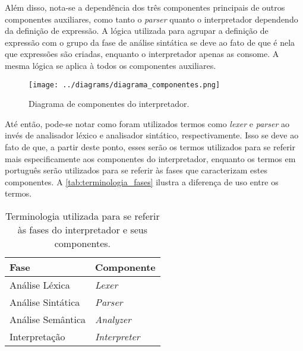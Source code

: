 Além disso, nota-se a dependência dos três componentes principais de outros componentes auxiliares, como tanto o \textit{parser} quanto o interpretador dependendo da definição de expressão. A lógica utilizada para agrupar a definição de expressão com o grupo da fase de análise sintática se deve ao fato de que é nela que expressões são criadas, enquanto o interpretador apenas as consome. A mesma lógica se aplica à todos os componentes auxiliares.

\begin{figure}[H]
	\centering
	\texttt{[image: ../diagrams/diagrama\_componentes.png]}
	\caption{Diagrama de componentes do interpretador.}
	\label{fig:diagrama_componentes}
\end{figure}

Até então, pode-se notar como foram utilizados termos como \textit{lexer} e \textit{parser} ao invés de analisador léxico e analisador sintático, respectivamente. Isso se deve ao fato de que, a partir deste ponto, esses serão os termos utilizados para se referir mais especificamente aos componentes do interpretador, enquanto os termos em português serão utilizados para se referir às fases que caracterizam estes componentes. A \autoref{tab:terminologia_fases} ilustra a diferença de uso entre os termos.

\begin{table}[h]
	\centering
	\caption{Terminologia utilizada para se referir às fases do interpretador e seus componentes.}
	{
		\begin{tabular}{ll}
			\hline
			\textbf{Fase}     & \textbf{Componente}  \\ \hline
			Análise Léxica    & \textit{Lexer}       \\
			Análise Sintática & \textit{Parser}      \\
			Análise Semântica & \textit{Analyzer}    \\
			Interpretação     & \textit{Interpreter} \\ \hline
		\end{tabular}
	}
	\label{tab:terminologia_fases}
\end{table}
